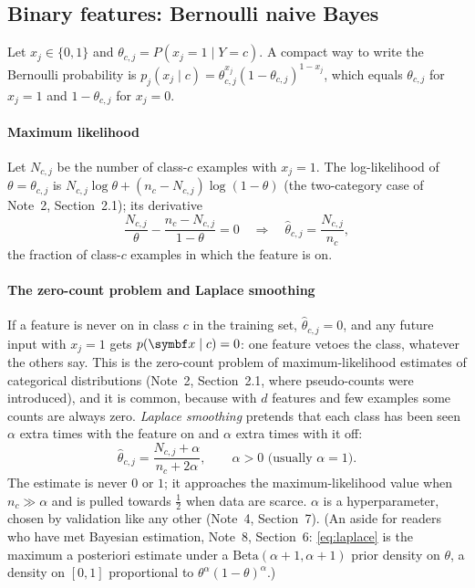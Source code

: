 \documentclass[11pt]{article}
\begin{document}
\subsection{Binary features: Bernoulli naive Bayes}\label{sec:bernoulli}

Let $x_j \in \{0, 1\}$ and $\theta_{c,j} = P(x_j = 1 \mid Y = c)$. A compact way to write the Bernoulli probability is
$p_j(x_j \mid c) = \theta_{c,j}^{x_j} (1 - \theta_{c,j})^{1 - x_j}$, which equals $\theta_{c,j}$ for $x_j = 1$ and
$1 - \theta_{c,j}$ for $x_j = 0$.

\paragraph{Maximum likelihood} Let $N_{c,j}$ be the number of class-$c$ examples with $x_j = 1$. The log-likelihood
of $\theta = \theta_{c,j}$ is $N_{c,j} \log\theta + (n_c - N_{c,j}) \log(1 - \theta)$ (the two-category case of Note~2, Section~2.1); its derivative
\[
  \frac{N_{c,j}}{\theta} - \frac{n_c - N_{c,j}}{1 - \theta} = 0
  \quad\Rightarrow\quad \hat\theta_{c,j} = \frac{N_{c,j}}{n_c} ,
\]
the fraction of class-$c$ examples in which the feature is on.

\paragraph{The zero-count problem and Laplace smoothing} If a feature is never on in class $c$ in the training set,
$\hat\theta_{c,j} = 0$, and any future input with $x_j = 1$ gets $p(\x \mid c) = 0$: one feature vetoes the class,
whatever the others say. This is the zero-count problem of maximum-likelihood estimates of categorical
distributions (Note~2, Section~2.1, where pseudo-counts were introduced), and it is common, because with $d$ features and few examples some counts are
always zero. \emph{Laplace smoothing} pretends that each class has been seen $\alpha$ extra times with the feature on
and $\alpha$ extra times with it off:
\begin{equation}\label{eq:laplace}
  \hat\theta_{c,j} = \frac{N_{c,j} + \alpha}{n_c + 2\alpha} , \qquad \alpha > 0 \text{ (usually } \alpha = 1\text{)}.
\end{equation}
The estimate is never $0$ or $1$; it approaches the maximum-likelihood value when $n_c \gg \alpha$ and is pulled towards
$\tfrac12$ when data are scarce. $\alpha$ is a hyperparameter, chosen by validation like any other (Note~4,
Section~7). (An aside for readers who have met Bayesian estimation, Note~8, Section~6: \eqref{eq:laplace} is the
maximum a posteriori estimate under a $\mathrm{Beta}(\alpha + 1, \alpha + 1)$ prior density on $\theta$, a density on
$[0, 1]$ proportional to $\theta^{\alpha}(1 - \theta)^{\alpha}$.)
\end{document}
